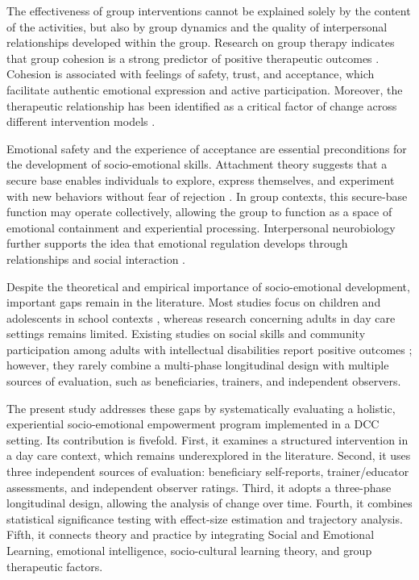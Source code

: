 \documentclass[journal]{IEEEtran}
\begin{document}
The effectiveness of group interventions cannot be explained solely by the content of the activities, but also by group dynamics and the quality of interpersonal relationships developed within the group. Research on group therapy indicates that group cohesion is a strong predictor of positive therapeutic outcomes \cite{burlingame2011}. Cohesion is associated with feelings of safety, trust, and acceptance, which facilitate authentic emotional expression and active participation. Moreover, the therapeutic relationship has been identified as a critical factor of change across different intervention models \cite{norcross2019,wampold2015}.

Emotional safety and the experience of acceptance are essential preconditions for the development of socio-emotional skills. Attachment theory suggests that a secure base enables individuals to explore, express themselves, and experiment with new behaviors without fear of rejection \cite{bowlby1988}. In group contexts, this secure-base function may operate collectively, allowing the group to function as a space of emotional containment and experiential processing. Interpersonal neurobiology further supports the idea that emotional regulation develops through relationships and social interaction \cite{siegel2012,schore2012}.

Despite the theoretical and empirical importance of socio-emotional development, important gaps remain in the literature. Most studies focus on children and adolescents in school contexts \cite{humphrey2013,oberle2019}, whereas research concerning adults in day care settings remains limited. Existing studies on social skills and community participation among adults with intellectual disabilities report positive outcomes \cite{hall2009,verdonschot2009}; however, they rarely combine a multi-phase longitudinal design with multiple sources of evaluation, such as beneficiaries, trainers, and independent observers.

The present study addresses these gaps by systematically evaluating a holistic, experiential socio-emotional empowerment program implemented in a DCC setting. Its contribution is fivefold. First, it examines a structured intervention in a day care context, which remains underexplored in the literature. Second, it uses three independent sources of evaluation: beneficiary self-reports, trainer/educator assessments, and independent observer ratings. Third, it adopts a three-phase longitudinal design, allowing the analysis of change over time. Fourth, it combines statistical significance testing with effect-size estimation and trajectory analysis. Fifth, it connects theory and practice by integrating Social and Emotional Learning, emotional intelligence, socio-cultural learning theory, and group therapeutic factors.
\end{document}
